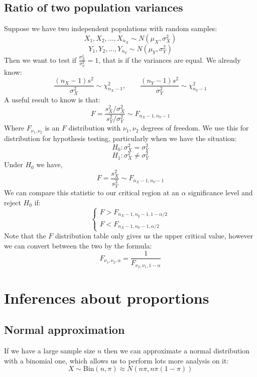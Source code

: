 \documentclass[12pt]{article}
\begin{document}
\subsection*{Ratio of two population variances}
Suppose we have two independent populations with random samples:
\[X_1,X_2,...,X_{n_X}\sim N(\mu_X,\sigma^2_X)\]
\[Y_1,Y_2,...,Y_{n_Y}\sim N(\mu_Y,\sigma^2_Y)\]
Then we want to test if \(\frac{\sigma^2_X}{\sigma^2_Y}=1\), that is if the variances are equal. We already know:
\[\frac{(n_X-1)s^2}{\sigma^2_X}\sim\chi^2_{n_X-1},\qquad \frac{(n_Y-1)s^2}{\sigma^2_Y}\sim\chi^2_{n_Y-1}\]
A useful result to know is that:
\[F=\frac{s^2_X/\sigma^2_X}{s^2_Y/\sigma^2_Y}\sim F_{n_X-1,n_Y-1}\]
Where \(F_{\nu_1,\nu_2}\) is an \(F\) distribution with \(\nu_1,\nu_2\) degrees of freedom. We use this for distribution for hypothesis testing, particularly when we have the situation:
\[H_0:\sigma^2_X=\sigma^2_Y\]
\[H_1:\sigma_X^2\ne\sigma^2_Y\]
Under \(H_0\) we have,
\[F=\frac{s^2_X}{s^2_Y}\sim F_{n_X-1,n_Y-1}\]
We can compare this statistic to our critical region at an \(\alpha\) significance level and reject \(H_0\) if:
\[\begin{cases}
    F>F_{n_X-1,n_y-1,1-\alpha/2} \\
    F<F_{n_X-1,n_Y-1,\alpha/2}
\end{cases}\]
Note that the \(F\) distribution table only gives us the upper critical value, however we can convert between the two by the formula:
\[F_{\nu_1,\nu_2,\alpha}=\frac{1}{F_{\nu_2,\nu_1,1-\alpha}}\]
\section{Inferences about proportions}
\subsection*{Normal approximation}
If we have a large sample size \(n\) then we can approximate a normal distribution with a binomial one, which allows us to perform lots more analysis on it:
\[X\sim \text{Bin}(n,\pi)\approx N(n\pi,n\pi(1-\pi))\]
\end{document}
